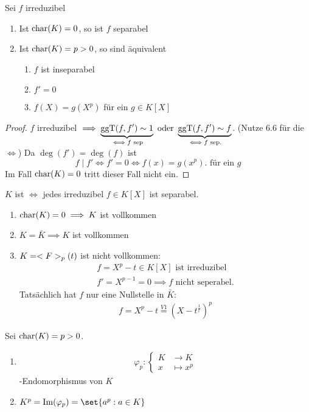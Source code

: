 \begin{conclusion}
	Sei $f$ irreduzibel
	\begin{enumerate}
		\item Ist $\operatorname{char}(K) = 0$, so ist $f$ separabel
		\item Ist $\operatorname{char}(K) = p>0$, so sind äquivalent
		\begin{enumerate}
			\item $f$ ist inseparabel
			\item $f' = 0$
			\item $f(X) = g(X^p)$ für ein $g \in K[X]$
		\end{enumerate}
	\end{enumerate}
\end{conclusion}
\begin{proof}
	$f$ irreduzibel $\implies \underbrace{\operatorname{ggT}(f,f') \sim 1}_{\iff f \text{ sep}} \text{ oder } \underbrace{\operatorname{ggT}(f,f') \sim f}_{\iff f \text{ sep.}}$. (Nutze 6.6 für die $\iff$) Da $\deg(f') = \deg(f)$ ist
	\[
		f \mid f' \iff f' = 0 \iff f(x) = g(x^p). \text{ für ein }g
	\]
	Im Fall $\operatorname{char}(K) = 0$ tritt dieser Fall nicht ein.
\end{proof}
\begin{definition}[vollkommen]
	$K$ ist  $\iff$ jedes irreduzibel $f \in K[X]$ ist separabel.
\end{definition}
\begin{example}
	\begin{enumerate}
		\item $\operatorname{char}(K) = 0 \implies K$ ist vollkommen
		\item $K = \bar{K} \implies K$ ist vollkommen
		\item $K = <F>_p (t)$ ist nicht vollkommen:
		\begin{align*}
			f = X^p - t \in K[X] \text{ ist irreduzibel}\\
			f' = X^{p-1} = 0 \implies f \text{ nicht seperabel.}
		\end{align*}
		Tatsächlich hat $f$ nur eine Nullstelle in $\bar{K}$:
		\begin{align*}
			f = X^p - t \overset{V1}{=} (X - t^{\frac{1}{t}})^p
		\end{align*}
	\end{enumerate}
\end{example}
\begin{definition}[title]
	Sei $\operatorname{char}(K) = p > 0$.
	\begin{enumerate}
		\item \begin{align*}
		\varphi_p : \begin{cases}
		K &\to K\\
		x &\mapsto x^p 
		\end{cases}
		\end{align*}
		-Endomorphismus von $K$
		\item $K^p = \Image(\varphi_p) = \set{a^p : a \in K}$
	\end{enumerate}
\end{definition}
